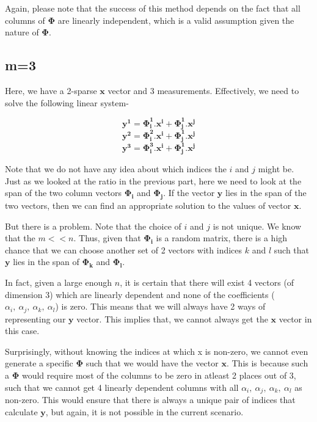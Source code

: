 \documentclass[a4paper,11pt]{article}
\numberwithin{definition}{section}
\numberwithin{mytheorem}{subsection}
\begin{document}
Again, please note that the success of this method depends on the fact that all columns of $\mathbf{\Phi}$ are linearly independent, which is a valid assumption given the nature of $\mathbf{\Phi}$.

\subsection{m=3}

Here, we have a 2-sparse $\mathbf{x}$ vector and 3 measurements.
Effectively, we need to solve the following linear system-

$$\mathbf{y^1} = \mathbf{\Phi_i^1.x^i + \Phi_j^1.x^j}$$
$$\mathbf{y^2} = \mathbf{\Phi_i^2.x^i + \Phi_j^1.x^j}$$
$$\mathbf{y^3} = \mathbf{\Phi_i^3.x^i + \Phi_j^1.x^j}$$

Note that we do not have any idea about which indices the $i$ and $j$ might be.\\
Just as we looked at the ratio in the previous part, here we need to look at the span of the two column vectors $\mathbf{\Phi_i}$ and $\mathbf{\Phi_j}$. If the vector $\mathbf{y}$ lies in the span of the two vectors, then we can find an appropriate solution to the values of vector $\mathbf{x}$.

But there is a problem. Note that the choice of $i$ and $j$ is not unique. We know that the $m << n$. Thus, given that $\mathbf{\Phi_i}$ is a random matrix, there is a high chance that we can choose another set of 2 vectors with indices $k$ and $l$ such that $\mathbf{y}$ lies in the span of $\mathbf{\Phi_k}$ and $\mathbf{\Phi_l}$.

In fact, given a large enough $n$, it is certain that there will exist 4 vectors (of dimension 3) which are linearly dependent and none of the coefficients
($\alpha_i,~\alpha_j,~\alpha_k,~\alpha_l$) is zero. This means that we will always have 2 ways of representing our $\mathbf{y}$ vector. This implies that, we cannot always get the $\mathbf{x}$ vector in this case.

Surprisingly, without knowing the indices at which x is non-zero, we cannot even generate a specific $\mathbf{\Phi}$ such that we would have the vector $\mathbf{x}$. This is because such a $\mathbf{\Phi}$ would require most of the columns to be zero in atleast 2 places out of 3, such that we cannot get 4 linearly dependent columns with all $\alpha_i,~\alpha_j,~\alpha_k,~\alpha_l$ as non-zero. This would ensure that there is always a unique pair of indices that calculate $\mathbf{y}$, but again, it is not possible in the current scenario.
\end{document}
